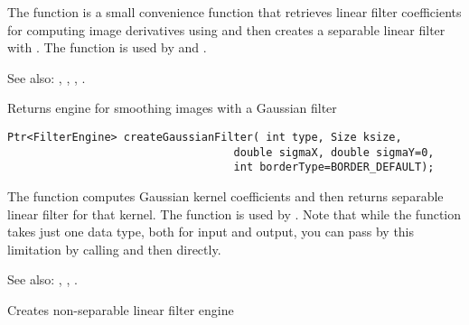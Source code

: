 The function  is a small convenience function that retrieves linear filter coefficients for computing image derivatives using  and then creates a separable linear filter with . The function is used by  and .

See also: , , , .

Returns engine for smoothing images with a Gaussian filter

\begin{lstlisting}
Ptr<FilterEngine> createGaussianFilter( int type, Size ksize,
                                   double sigmaX, double sigmaY=0,
                                   int borderType=BORDER_DEFAULT);
\end{lstlisting}
\begin{description}
\end{description}

The function  computes Gaussian kernel coefficients and then returns separable linear filter for that kernel. The function is used by . Note that while the function takes just one data type, both for input and output, you can pass by this limitation by calling  and then  directly.

See also: , , .

Creates non-separable linear filter engine

